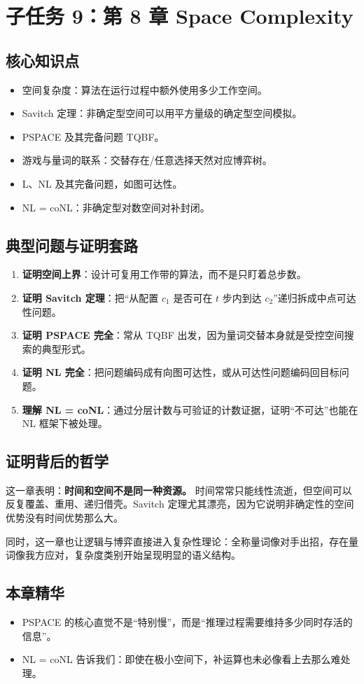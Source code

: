 \section{子任务 9：第 8 章 Space Complexity}

\subsection{核心知识点}

\begin{itemize}[leftmargin=2em]
  \item 空间复杂度：算法在运行过程中额外使用多少工作空间。
  \item Savitch 定理：非确定型空间可以用平方量级的确定型空间模拟。
  \item PSPACE 及其完备问题 TQBF。
  \item 游戏与量词的联系：交替存在/任意选择天然对应博弈树。
  \item L、NL 及其完备问题，如图可达性。
  \item NL = coNL：非确定型对数空间对补封闭。
\end{itemize}

\subsection{典型问题与证明套路}

\begin{enumerate}[leftmargin=2em]
  \item \textbf{证明空间上界}：设计可复用工作带的算法，而不是只盯着总步数。
  \item \textbf{证明 Savitch 定理}：把“从配置 $c_1$ 是否可在 $t$ 步内到达 $c_2$”递归拆成中点可达性问题。
  \item \textbf{证明 PSPACE 完全}：常从 TQBF 出发，因为量词交替本身就是受控空间搜索的典型形式。
  \item \textbf{证明 NL 完全}：把问题编码成有向图可达性，或从可达性问题编码回目标问题。
  \item \textbf{理解 NL = coNL}：通过分层计数与可验证的计数证据，证明“不可达”也能在 NL 框架下被处理。
\end{enumerate}

\subsection{证明背后的哲学}

这一章表明：\textbf{时间和空间不是同一种资源。}
时间常常只能线性流逝，但空间可以反复覆盖、重用、递归借壳。Savitch 定理尤其漂亮，因为它说明非确定性的空间优势没有时间优势那么大。

同时，这一章也让逻辑与博弈直接进入复杂性理论：全称量词像对手出招，存在量词像我方应对，复杂度类别开始呈现明显的语义结构。

\subsection{本章精华}

\begin{itemize}[leftmargin=2em]
  \item PSPACE 的核心直觉不是“特别慢”，而是“推理过程需要维持多少同时存活的信息”。
  \item NL = coNL 告诉我们：即使在极小空间下，补运算也未必像看上去那么难处理。
\end{itemize}

\newpage
